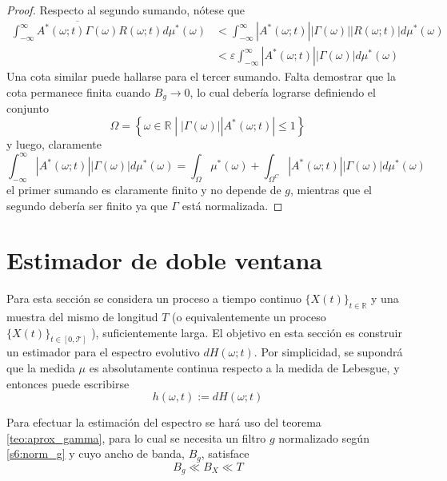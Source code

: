 \documentclass[12pt,letterpaper]{book}
\newcommand{\R}{\mathbb{R}}
\newcommand{\intR}{\int_{-\infty}^{\infty}}
\newcommand{\abso}[1]{\left| #1 \right|}
\newcommand{\xtin}[1]{$\{X(t)\}_{t\in \mathcal{ #1 }}$ }
\newcommand{\talque}{\mathrel{}\middle|\mathrel{}}
\begin{document}
\begin{proof}
Respecto al segundo sumando, nótese que 
\begin{align*}
\intR \overline{A^{*}(\omega; t) \Gamma(\omega)} R(\omega; t) d\mu^{*}(\omega)
&< \intR \abso{A^{*}(\omega; t)} \abso{ \Gamma(\omega)} \abso{R(\omega; t)} d\mu^{*}(\omega) \\
&< \varepsilon \intR \abso{A^{*}(\omega; t)}\abso{ \Gamma(\omega)} d\mu^{*}(\omega)
\end{align*}
Una cota similar puede hallarse para el tercer sumando.
%
Falta demostrar que la cota permanece finita cuando $B_g \rightarrow 0$, lo cual debería lograrse definiendo el conjunto
\begin{equation}
\Omega = \left\{ \omega \in \R \talque \abso{\Gamma(\omega)} \abso{A^{*}(\omega; t)} \leq 1 \right\} 
\end{equation}
y luego, claramente
\begin{equation}
\intR \abso{A^{*}(\omega; t)}\abso{ \Gamma(\omega)} d\mu^{*}(\omega) = 
\int_\Omega \mu^{*}(\omega) + 
\int_{\Omega^{C}} \abso{A^{*}(\omega; t)}\abso{ \Gamma(\omega)} d\mu^{*}(\omega)
\end{equation}
el primer sumando es claramente finito y no depende de $g$, mientras que el segundo debería ser finito ya que $\Gamma$ está normalizada.
\end{proof}


\section{Estimador de doble ventana}
\label{sec:doble_ventana}

Para esta sección se considera un proceso a tiempo continuo \xtin{\R} y una muestra del mismo de longitud $T$ (o equivalentemente un proceso \xtin{[0,T]}), suficientemente larga. El objetivo en esta sección es construir un estimador para el espectro evolutivo $dH(\omega; t)$.
%
Por simplicidad, se supondrá que la medida $\mu$ es absolutamente continua respecto a la medida de Lebesgue, y entonces puede escribirse
\begin{equation}
h(\omega,t) := dH(\omega; t)
\end{equation}

Para efectuar la estimación del espectro se hará uso del teorema \ref{teo:aprox_gamma}, para lo cual se necesita un filtro $g$ normalizado según \ref{s6:norm_g} y cuyo ancho de banda, $B_g$, satisface
\begin{equation}
B_g \ll B_X \ll T
\label{s6:anchos_banda}
\end{equation}
\end{document}
